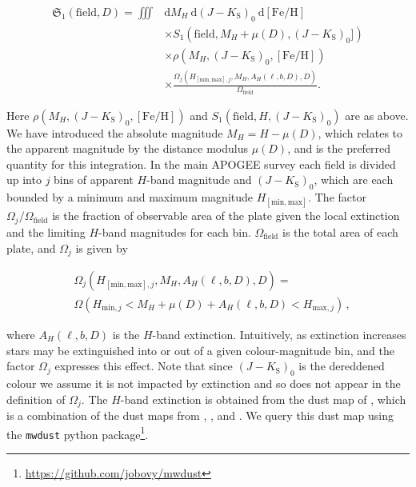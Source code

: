 \begin{equation}
\label{ch3:eq:effective-selection-function}
\begin{split}
\mathfrak{S}_{1}(\mathrm{field},D) = \iiint & \mathrm{d} M_{H}\ \mathrm{d} (J-K_\mathrm{S})_{0}\ \mathrm{d} [\mathrm{Fe/H}] \\
& \times S_{1}(\mathrm{field}, M_{H}+\mu(D), (J-K_\mathrm{S})_{0}]) \\
& \times \rho(M_{H},(J-K_\mathrm{S})_{0}, [\mathrm{Fe/H}]) \\
& \times \frac{\Omega_{j}(H_{[\mathrm{min},\mathrm{max}],j},M_{H},A_{H}(\ell,b,D),D)}{\Omega_\mathrm{field}}.
\end{split}
\end{equation}

\noindent Here $\rho(M_{H},(J-K_\mathrm{S})_{0},[\mathrm{Fe/H}])$ and $S_{1}(\mathrm{field}, H, (J-K_\mathrm{S})_{0})$ are as above. We have introduced the absolute magnitude $M_{H} = H - \mu(D)$, which relates to the apparent magnitude by the distance modulus $\mu(D)$, and is the preferred quantity for this integration. In the main APOGEE survey each field is divided up into $j$ bins of apparent ${H}$-band magnitude and $(J-K_\mathrm{S})_{0}$, which are each bounded by a minimum and maximum magnitude $H_{[\mathrm{min},\mathrm{max}]}$. The factor $\Omega_{j}/\Omega_\mathrm{field}$ is the fraction of observable area of the plate given the local extinction and the limiting $H$-band magnitudes for each bin. $\Omega_\mathrm{field}$ is the total area of each plate, and $\Omega_{j}$ is given by

\begin{equation}
\begin{split}
& \Omega_{j}(H_{[\mathrm{min},\mathrm{max}],j},M_{H},A_{H}(\ell,b,D),D) = \\
& \Omega(H_{\mathrm{min},j} < M_{H}+\mu(D)+A_{H}(\ell,b,D) < H_{\mathrm{max},j} )\,,
\end{split}
\end{equation}

\noindent where $A_{H}(\ell,b,D)$ is the $H$-band extinction. Intuitively, as extinction increases stars may be extinguished into or out of a given colour-magnitude bin, and the factor $\Omega_{j}$ expresses this effect. Note that since $(J-K_\mathrm{S})_{0}$ is the dereddened colour we assume it is not impacted by extinction and so does not appear in the definition of $\Omega_{j}$. The $H$-band extinction is obtained from the dust map of \textcite{bovy16a}, which is a combination of the dust maps from \textcite{marshall06}, \textcite{green15}, and \textcite{drimmel03}. We query this dust map using the \texttt{mwdust} python package\footnote{\url{https://github.com/jobovy/mwdust}}.

